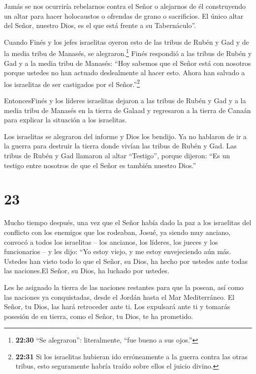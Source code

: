  Jamás se nos ocurriría rebelarnos contra el Señor o
alejarnos de él construyendo un altar para hacer holocaustos o ofrendas
de grano o sacrificios. El único altar del Señor, nuestro Dios, es el
que está frente a su Tabernáculo''.

 Cuando Finés y los jefes israelitas oyeron esto de las
tribus de Rubén y Gad y de la media tribu de Manasés, se
alegraron.\footnote{\textbf{22:30} ``Se alegraron'': literalmente, ``fue
  bueno a sus ojos.''}  Finés respondió a las tribus de
Rubén y Gad y a la media tribu de Manasés: ``Hoy sabemos que el Señor
está con nosotros porque ustedes no han actuado deslealmente al hacer
esto. Ahora han salvado a los israelitas de ser castigados por el
Señor.''\footnote{\textbf{22:31} Si los israelitas hubieran ido
  erróneamente a la guerra contra las otras tribus, esto seguramente
  habría traído sobre ellos el juicio divino.}

 EntoncesFinés y los líderes israelitas dejaron a las
tribus de Rubén y Gad y a la media tribu de Manasés en la tierra de
Galaad y regresaron a la tierra de Canaán para explicar la situación a
los israelitas.

 Los israelitas se alegraron del informe y Dios los
bendijo. Ya no hablaron de ir a la guerra para destruir la tierra donde
vivían las tribus de Rubén y Gad.  Las tribus de Rubén y
Gad llamaron al altar ``Testigo'', porque dijeron: ``Es un testigo entre
nosotros de que el Señor es también nuestro Dios.''

\hypertarget{section-22}{%
\section{23}\label{section-22}}

 Mucho tiempo después, una vez que el Señor había dado la
paz a los israelitas del conflicto con los enemigos que los rodeaban,
Josué, ya siendo muy anciano,  convocó a todos los
israelitas -- los ancianos, los líderes, los jueces y los funcionarios
-- y les dijo: ``Yo estoy viejo, y me estoy envejeciendo aún más.
 Ustedes han visto todo lo que el Señor, su Dios, ha hecho
por ustedes ante todas las naciones.El Señor, su Dios, ha luchado por
ustedes.

 Les he asignado la tierra de las naciones restantes para
que la posean, así como las naciones ya conquistadas, desde el Jordán
hasta el Mar Mediterráneo.  El Señor, tu Dios, las hará
retroceder ante ti. Los expulsará ante ti y tomarás posesión de su
tierra, como el Señor, tu Dios, te ha prometido.

